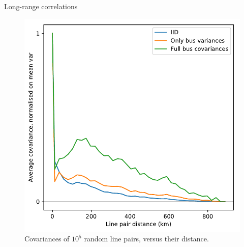 \documentclass[10pt]{beamer}
\begin{document}
\begin{frame}{Long-range correlations}
    \begin{figure}
    \includegraphics[height=.65\paperheight]{img/line_covariance_vs_line_distance.pdf}
    \caption{Covariances of $10^5$ random line pairs, versus their distance.}
    \end{figure}
\end{frame}
\end{document}
